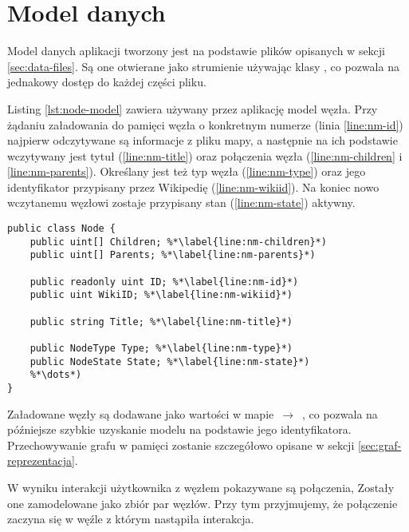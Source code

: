 \section{Model danych}

Model danych aplikacji tworzony jest na podstawie plików opisanych w sekcji \ref{sec:data-files}. Są one otwierane jako strumienie używając klasy , co pozwala na jednakowy dostęp do każdej części pliku. 

Listing \ref{lst:node-model} zawiera używany przez aplikację model węzła. Przy żądaniu załadowania do pamięci węzła o konkretnym numerze (linia \ref{line:nm-id}) najpierw odczytywane są informacje z pliku mapy, a następnie na ich podstawie wczytywany jest tytuł (\ref{line:nm-title}) oraz połączenia węzła (\ref{line:nm-children} i \ref{line:nm-parents}). Określany jest też typ węzła (\ref{line:nm-type}) oraz jego identyfikator przypisany przez Wikipedię (\ref{line:nm-wikiid}). Na koniec nowo wczytanemu węzłowi zostaje przypisany stan (\ref{line:nm-state}) aktywny.
\begin{lstlisting}[caption={Model węzła grafu}, label=lst:node-model]
public class Node {
	public uint[] Children; %*\label{line:nm-children}*)
	public uint[] Parents; %*\label{line:nm-parents}*)

	public readonly uint ID; %*\label{line:nm-id}*)
	public uint WikiID; %*\label{line:nm-wikiid}*)

	public string Title; %*\label{line:nm-title}*)

	public NodeType Type; %*\label{line:nm-type}*)
	public NodeState State; %*\label{line:nm-state}*)
	%*\dots*)
}
\end{lstlisting}

Załadowane węzły są dodawane jako wartości w mapie  $\,\to\,$ , co pozwala na późniejsze szybkie uzyskanie modelu na podstawie jego identyfikatora. Przechowywanie grafu w pamięci zostanie szczegółowo opisane w sekcji \ref{sec:graf-reprezentacja}.

W wyniku interakcji użytkownika z węzłem pokazywane są połączenia, Zostały one zamodelowane jako zbiór par węzłów. Przy tym przyjmujemy, że połączenie zaczyna się w węźle z którym nastąpiła interakcja.
